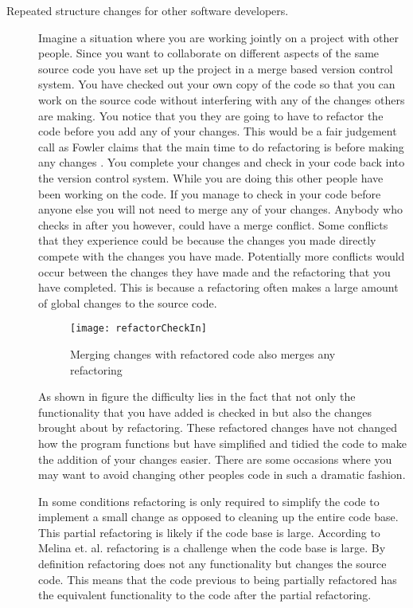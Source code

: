 \begin{description}
  \item [Repeated structure changes for other software developers.]   
    Imagine a situation where you are working jointly on a project with other people. Since you want to collaborate on different aspects of the same source code you have set up the project in a merge based version control system.  You have checked out your own copy of the code so that you can work on the source code without interfering with any of the changes others are making. You notice that you they are going to have to refactor the code before you add any of your changes.  This would be a fair judgement call as Fowler claims that the main time to do refactoring is before making any changes \cite{Fowler1999}. You complete your changes and check in your code back into the version control system.  While you are doing this other people have been working on the code.  If you manage to check in your code before anyone else you will not need to merge any of your changes.  Anybody who checks in after you however, could have a merge conflict.  Some conflicts that they experience could be because the changes you made directly compete with the changes you have made. Potentially more conflicts would occur between the changes they have made and the refactoring that you have completed. This is because a refactoring often makes a large amount of global changes to the source code.



    \begin{figure}
    \begin{center}
    \texttt{[image: refactorCheckIn]}
    \end{center}
    \caption{Merging changes with refactored code also merges any refactoring}
    \end{figure}

    As shown in figure the difficulty lies in the fact that not only the functionality that you have added is checked in but also the changes brought about by refactoring.  These refactored changes have not changed how the program functions but have simplified and tidied the code to make the addition of your changes easier. There are some occasions where you may want to avoid changing other peoples code in such a dramatic fashion.  

    In some conditions refactoring is only required to simplify the code to implement a small change as opposed to cleaning up the entire code base.  This partial refactoring is likely if the code base is large. According to Melina et. al. \cite{Milea2014} refactoring is a challenge when the code base is large. By definition refactoring does not any functionality but changes the source code. This means that the code previous to being partially refactored has the equivalent functionality to the code after the partial refactoring.


\end{description}
